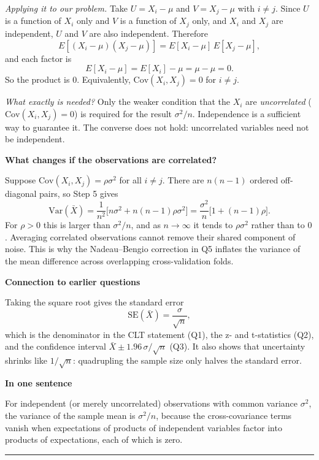 \documentclass[11pt]{article}
\begin{document}
\emph{Applying it to our problem.} Take \(U=X_i-\mu\) and \(V=X_j-\mu\) with \(i\neq j\). Since \(U\) is a function of \(X_i\) only and \(V\) is a function of \(X_j\) only, and \(X_i\) and \(X_j\) are independent, \(U\) and \(V\) are also independent. Therefore
\[
E[(X_i-\mu)(X_j-\mu)]=E[X_i-\mu]\,E[X_j-\mu],
\]
and each factor is
\[
E[X_i-\mu]=E[X_i]-\mu=\mu-\mu=0.
\]
So the product is \(0\). Equivalently, \(\mathrm{Cov}(X_i,X_j)=0\) for \(i\neq j\).

\emph{What exactly is needed?} Only the weaker condition that the \(X_i\) are \emph{uncorrelated} (\(\mathrm{Cov}(X_i,X_j)=0\)) is required for the result \(\sigma^2/n\). Independence is a sufficient way to guarantee it. The converse does not hold: uncorrelated variables need not be independent.

\textbf{What changes if the observations are correlated?}

Suppose \(\mathrm{Cov}(X_i,X_j)=\rho\sigma^{2}\) for all \(i\neq j\). There are \(n(n-1)\) ordered off-diagonal pairs, so Step 5 gives
\[
\mathrm{Var}(\bar X)
=\frac{1}{n^{2}}\Big[n\sigma^{2}+n(n-1)\rho\sigma^{2}\Big]
=\frac{\sigma^{2}}{n}\Big[1+(n-1)\rho\Big].
\]
For \(\rho>0\) this is larger than \(\sigma^{2}/n\), and as \(n\to\infty\) it tends to \(\rho\sigma^{2}\) rather than to \(0\). Averaging correlated observations cannot remove their shared component of noise. This is why the Nadeau--Bengio correction in Q5 inflates the variance of the mean difference across overlapping cross-validation folds.

\textbf{Connection to earlier questions}

Taking the square root gives the standard error
\[
\mathrm{SE}(\bar X)=\frac{\sigma}{\sqrt n},
\]
which is the denominator in the CLT statement (Q1), the z- and t-statistics (Q2), and the confidence interval \(\bar X\pm1.96\,\sigma/\sqrt n\) (Q3). It also shows that uncertainty shrinks like \(1/\sqrt n\): quadrupling the sample size only halves the standard error.

\textbf{In one sentence}

For independent (or merely uncorrelated) observations with common variance \(\sigma^{2}\), the variance of the sample mean is \(\sigma^{2}/n\), because the cross-covariance terms vanish when expectations of products of independent variables factor into products of expectations, each of which is zero.

\vspace{5mm}
\hrule
\vspace{5mm}
\end{document}

